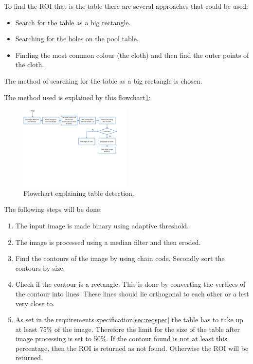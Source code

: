 To find the ROI that is the table there are several approaches that could be used:
\begin{itemize}
	\item Search for the table as a big rectangle.
	\item Searching for the holes on the pool table.
	\item Finding the most common colour (the cloth) and then find the outer points of the cloth.
\end{itemize}

The method of searching for the table as a big rectangle is chosen. 					%

The method used is explained by this flowchart\ref{fig:detecttable_flowchart}:

\begin{figure}[htpb]
\begin{center}
\leavevmode
\includegraphics[width=0.5\textwidth]{images/tabledetect_flowchart.pdf}
\end{center}
\caption{Flowchart explaining table detection.}
\label{fig:detecttable_flowchart}
\end{figure}

The following steps will be done:
\begin{enumerate}

\item The input image is made binary using adaptive threshold.

\item The image is processed using a median filter and then eroded.

\item Find the contours of the image by using chain code. Secondly sort the contours by size.

\item Check if the contour is a rectangle. This is done by converting the vertices of the contour into lines. These lines should lie orthogonal to each other or a lest very close to.

\item As set in the requirements specification\ref{sec:reqspec} the table has to take up at least 75\% of the image. Therefore the limit for the size of the table after image processing is set to 50\%. If the contour found is not at least this percentage, then the ROI is returned as not found. Otherwise the ROI will be returned.
\end{enumerate}

